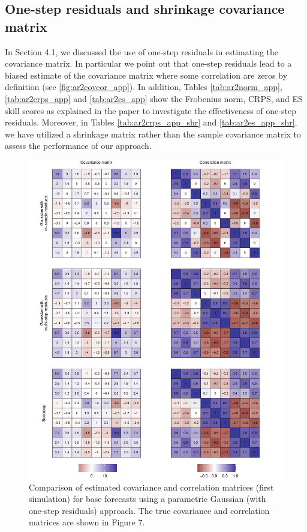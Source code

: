 \documentclass[a4paper,11pt]{article}
\theoremstyle{definition}
\begin{document}
\subsection{One-step residuals and shrinkage covariance matrix}

In Section 4.1, we discussed the use of one-step residuals in estimating the covariance matrix. In particular we point out that one-step residuals lead to a biased estimate of the covariance matrix where some correlation are zeros by definition (see \autoref{fig:ar2covcor_app}). 
In addition, Tables \ref{tab:ar2norm_app}, \ref{tab:ar2crps_app} and \ref{tab:ar2es_app} show the Frobenius norm, CRPS, and ES skill scores as explained in the paper to investigate the effectiveness of one-step residuals. 
Moreover, in Tables \ref{tab:ar2crps_app_shr} and \ref{tab:ar2es_app_shr}, we have utilized a shrinkage matrix rather than the sample covariance matrix to assess the performance of our approach.

\begin{figure}[p]
	\centering
	\includegraphics[width = \linewidth]{fig/AR/base_cov_app.pdf}
	\caption{Comparison of estimated covariance and correlation matrices (first simulation) for base forecasts using a parametric Gaussian (with one-step residuals) approach. The true covariance and correlation matrices are shown in Figure 7.}
	\label{fig:ar2covcor_app}
\end{figure}
\end{document}
